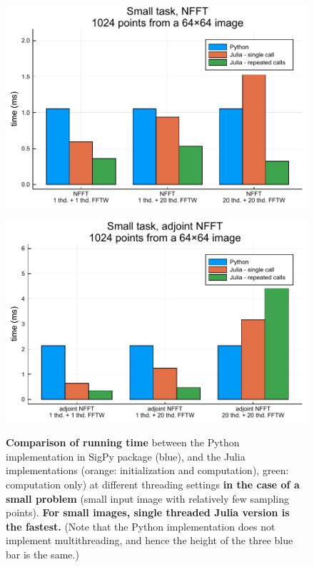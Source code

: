 \begin{figure}[htbp]
    \centering
    \begin{minipage}{0.48\linewidth}
        \centering
        \includegraphics[width=\linewidth]{images/nfft_small_forw.pdf}
        \label{fig:nfft_small_forw}
    \end{minipage}
    \begin{minipage}{0.48\linewidth}
        \centering
        \includegraphics[width=\linewidth]{images/nfft_small_backw.pdf}
        \label{fig:nfft_small_backw}
    \end{minipage}
    \caption{\textbf{Comparison of running time} between the Python implementation in SigPy package (blue), and the Julia implementations (orange: initialization and computation), green: computation only) at different threading settings \textbf{in the case of a small problem} (small input image with relatively few sampling points). \textbf{For small images, single threaded Julia version is the fastest.} (Note that the Python implementation does not implement multithreading, and hence the height of the three blue bar is the same.)}
    \label{fig:nfft_small}
\end{figure}

